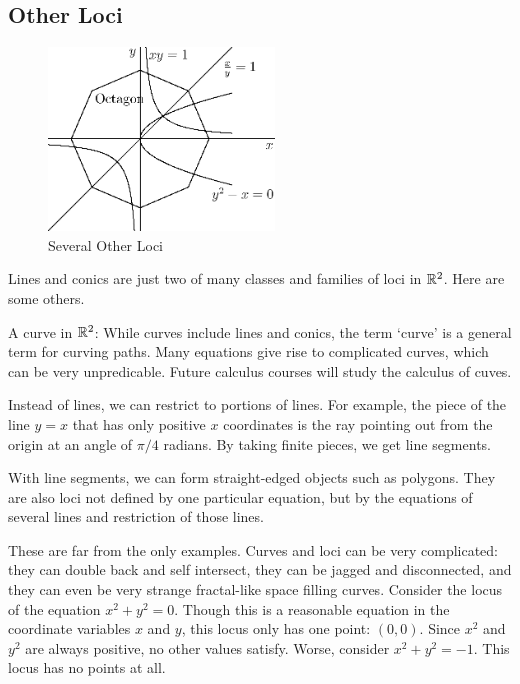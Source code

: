 \documentclass[fleqn]{report}
\begin{document}
\subsection{Other Loci}
\label{other-loci}

\begin{figure}[t]
\centering
\includegraphics[width=6cm]{figure07.eps}
\caption{Several Other Loci}
\label{figure-several-other-loci}
\end{figure}

Lines and conics are just two of many classes and families of
loci in $\mathbb{R}^2$. Here are some others.
\begin{smallitemize}
\item A curve in $\mathbb{R}^2$: While curves include lines and
conics, the term `curve' is a general term for curving paths.
Many equations give rise to complicated curves, which can 
be very unpredicable. Future calculus courses will study the
calculus of cuves.
\item Instead of lines, we can restrict to portions of lines.
For example, the piece of the line $y=x$ that has only positive
$x$ coordinates is the ray pointing out from the origin at an
angle of $\pi/4$ radians. By taking finite pieces, we get line
segments.
\item With line segments, we can form straight-edged objects
such as polygons. They are also loci not defined by one
particular equation, but by the equations of several lines and
restriction of those lines.
\end{smallitemize}
These are far from the only examples. Curves and loci can be
very complicated: they can double back and self intersect,
they can be jagged and disconnected, and they can even be very
strange fractal-like space filling curves. Consider the locus
of the equation $x^2 + y^2 =0$. Though this is a reasonable
equation in the coordinate variables $x$ and $y$, this locus
only has one point: $(0,0)$. Since $x^2$ and $y^2$ are always
positive, no other values satisfy. Worse, consider $x^2 + y^2
= -1$. This locus has no points at all.
\end{document}
